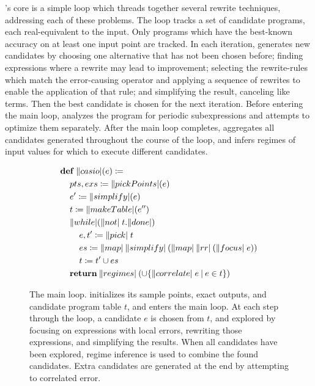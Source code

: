 \documentclass[paper.tex]{subfiles}
\begin{document}
\casio's core is a simple loop
  which threads together several rewrite techniques,
  addressing each of these problems.
The loop tracks a set of candidate programs,
  each real-equivalent to the input.
Only programs which have the best-known accuracy
  on at least one input point are tracked.
In each iteration, \casio generates new candidates
  by choosing one alternative that has not been chosen before;
  finding expressions where a rewrite may lead to improvement;
  selecting the rewrite-rules which match the error-causing operator
  and applying a sequence of rewrites to enable the application of that rule;
  and simplifying the result, canceling like terms.
Then the best candidate is chosen for the next iteration.
Before entering the main loop,
  \casio analyzes the program for periodic subexpressions
  and attempts to optimize them separately.
After the main loop completes,
  \casio aggregates all candidates generated
  throughout the course of the loop,
  and infers regimes of input values for which
  to execute different candidates.

\begin{figure}
\begin{footnotesize}
\begin{align*}
  &\!def!\:\|casio|(e) \ceq \\
  &\> pts, exs \ceq \|pickPoints|(e) \\
  &\> e' \ceq \|simplify|(e) \\
  &\> t \ceq \|makeTable|(e'') \\
  &\> \|while|(\|not| \; t.\|done|) \\
  &\> \> e, t' \ceq \|pick|\;t \\
  &\> \> es \ceq \|map|\:\|simplify|\:(\|map|\:\|rr|\:(\|focus|\;e)) \\
  &\> \> t \ceq t' \cup es \\
  &\> \!return!\:\|regimes|\:(\cup\{\|correlate|\;e \I e \in t \})
\end{align*}
\end{footnotesize}
\caption{The \casio main loop.
  \casio initializes its sample points, exact outputs,
    and candidate program table $t$, and enters the main loop.
  At each step through the loop, a candidate $e$ is chosen from $t$,
    and explored by focusing on expressions with local errors,
    rewriting those expressions, and simplifying the results.
  When all candidates have been explored,
    regime inference is used to combine the found candidates.
  Extra candidates are generated at the end by attempting to correlated error.}
\label{alg:main}
\end{figure}
\end{document}

